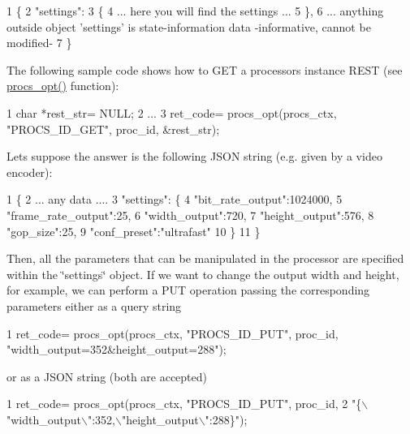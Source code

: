 \begin{DoxyCode}
1 \{
2     "settings":
3     \{
4         ... here you will find the settings ...
5     \},
6     ... anything outside object 'settings' is state-information data -informative, cannot be modified-
7 \}
\end{DoxyCode}


The following sample code shows how to G\+ET a processor\textquotesingle{}s instance R\+E\+ST (see \textquotesingle{}\hyperlink{procs_8c_a7af2e6f2788006cfc96ca8d811922ffa}{procs\+\_\+opt()}\textquotesingle{} function)\+:


\begin{DoxyCode}
1 char *rest\_str= NULL;
2 ...
3 ret\_code= procs\_opt(procs\_ctx, "PROCS\_ID\_GET", proc\_id, &rest\_str);
\end{DoxyCode}


Let\textquotesingle{}s suppose the answer is the following J\+S\+ON string (e.\+g. given by a video encoder)\+:


\begin{DoxyCode}
1 \{
2     ... any data ....
3     "settings": \{
4          "bit\_rate\_output":1024000,
5          "frame\_rate\_output":25,
6          "width\_output":720,
7          "height\_output":576,
8          "gop\_size":25,
9          "conf\_preset":"ultrafast"
10     \}
11 \}
\end{DoxyCode}


Then, all the parameters that can be manipulated in the processor are specified within the \char`\"{}settings\char`\"{} object. If we want to change the output width and height, for example, we can perform a P\+UT operation passing the corresponding parameters either as a query string


\begin{DoxyCode}
1 ret\_code= procs\_opt(procs\_ctx, "PROCS\_ID\_PUT", proc\_id, "width\_output=352&height\_output=288");
\end{DoxyCode}


or as a J\+S\+ON string (both are accepted)


\begin{DoxyCode}
1 ret\_code= procs\_opt(procs\_ctx, "PROCS\_ID\_PUT", proc\_id, 
2         "\{\(\backslash\)"width\_output\(\backslash\)":352,\(\backslash\)"height\_output\(\backslash\)":288\}");
\end{DoxyCode}


